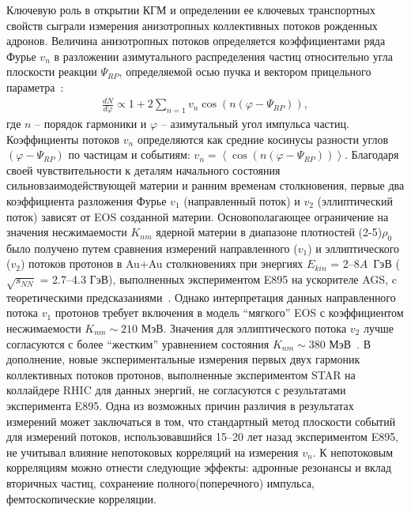 Ключевую роль в открытии  КГМ  и  определении ее ключевых транспортных свойств сыграли измерения анизотропных коллективных потоков рожденных адронов. 
Величина анизотропных потоков определяется коэффициентами ряда Фурье $v_n$ в разложении азимутального распределения частиц относительно угла плоскости реакции $\Psi_{RP}$, определяемой осью пучка и вектором прицельного параметра~\cite{Voloshin:2008dg}:
\begin{eqnarray}
   \frac{dN}{d\varphi} \propto 1 + 2 \sum_{n=1} v_n \cos\left( n \left( \varphi - \Psi_{RP} \right) \right),
\end{eqnarray}
%
где $n$ -- порядок гармоники и  $\varphi$ -- азимутальный угол импульса частиц.
Коэффициенты потоков  $v_n$ определяются как средние косинусы разности углов  $\left( \varphi - \Psi_{RP} \right)$ по частицам и событиям: $v_n=\left\langle \cos\left( n \left( \varphi - \Psi_{RP} \right) \right) \right\rangle$.
Благодаря своей чувствительности к деталям начального состояния сильновзаимодействующей материи и ранним временам столкновения, первые два коэффициента разложения Фурье $v_1$ (направленный поток) и $v_2$ (эллиптический поток) зависят от EOS созданной материи.
Основополагающее ограничение на значения несжимаемости $K_{nm}$ ядерной материи  в диапазоне плотностей (2-5)$\rho_{0}$ было получено путем сравнения измерений направленного ($v_1$) и эллиптического ($v_2$)  потоков  протонов в Au+Au столкновениях при энергиях  $E_{kin}$ = 2--8$A$~ГэВ ($\sqrt{s_{NN}}$ = 2.7--4.3 ГэВ), выполненных экспериментом E895 на ускорителе AGS, c теоретическими предсказаниями~\cite{E895:1999ldn,E895:2000maf,E895:2001axb}. 
Однако интерпретация данных направленного потока $v_1$ протонов требует включения в модель ``мягкого'' EOS с коэффициентом несжимаемости $K_{nm} \sim 210$ МэВ. 
Значения  для эллиптического потока $v_2$ лучше согласуются с более ``жестким'' уравнением состояния $K_{nm} \sim 380$ МэВ~\cite{Danielewicz:2002pu}. 
В дополнение, новые экспериментальные измерения первых двух гармоник коллективных потоков протонов, выполненные экспериментом  STAR на коллайдере RHIC для данных энергий, не согласуются с результатами эксперимента E895. Одна из возможных причин различия в результатах измерений может заключаться в том, что стандартный метод плоскости событий для измерений потоков, использовавшийся 15–20 лет назад экспериментом E895, не учитывал влияние непотоковых корреляций  на измерения $v_n$. 
К непотоковым корреляциям можно отнести следующие эффекты: адронные резонансы и вклад вторичных частиц, сохранение полного(поперечного) импульса, фемтоскопические корреляции. 
